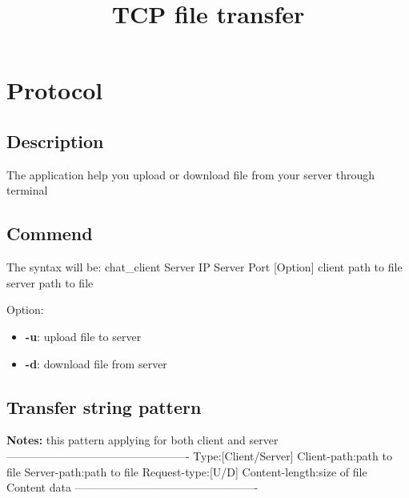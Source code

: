 \documentclass{article}
\title{TCP file transfer}
\begin{document}
\maketitle
\section{Protocol}
\subsection{Description}
The application help you upload or download file from your server through terminal
\subsection{Commend}
The syntax will be:
chat_client {Server IP} {Server Port} [Option] {client path to file} {server path to file}

Option:
\begin{itemize}
\item \textbf{-u}: upload file to server
\item \textbf{-d}: download file from server
\end{itemize}

\subsection{Transfer string pattern}
\textbf{Notes:} this pattern applying for both client and server\newline
-------------------------------------------------
Type:[Client/Server]
\n
Client-path:{path to file}
\n
Server-path:{path to file}
\n
Request-type:[U/D]
\n
Content-length:{size of file}
\n\n
{Content data}
-------------------------------------------------
\end{document}
